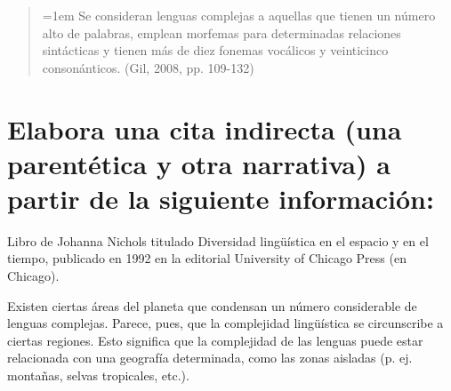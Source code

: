 \documentclass[12pt, a4paper, oneside]{report}
\begin{document}
                \begin{quote}
                    \hangindent=1em
                    \small
                    Se consideran lenguas complejas a aquellas que tienen un número alto de palabras, emplean
                    morfemas para determinadas relaciones sintácticas y tienen más de diez fonemas vocálicos y
                    veinticinco consonánticos. (Gil, 2008, pp. 109-132)
                \end{quote}

        \section{Elabora una cita indirecta (una parentética y otra narrativa) a partir de la siguiente información:}

            Libro de Johanna Nichols titulado Diversidad lingüística en el espacio y en el tiempo, publicado en 1992 en la editorial University of Chicago Press (en Chicago).

            Existen ciertas áreas del planeta que condensan un número considerable de lenguas complejas. Parece, pues, que la complejidad lingüística se circunscribe a ciertas regiones. Esto significa que la complejidad de las lenguas puede estar relacionada con una geografía determinada, como las zonas aisladas (p. ej. montañas, selvas tropicales, etc.).
\end{document}
